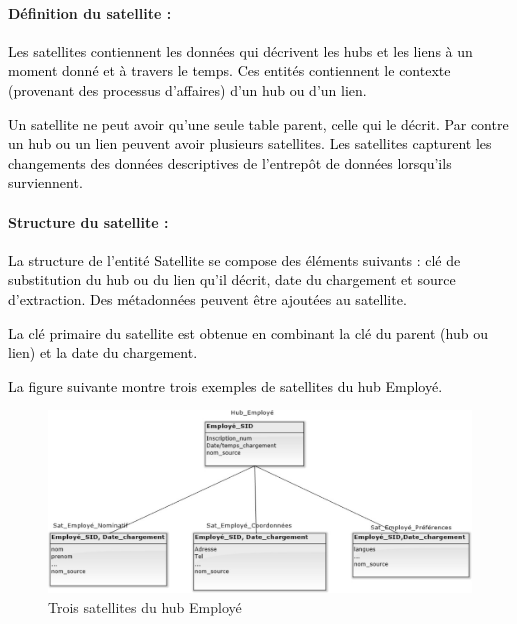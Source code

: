 \documentclass[a4paper,12pt]{report}
\begin{document}
\paragraph{Définition du satellite :}

\textcolor{black}{Les satellites contiennent les données qui décrivent les hubs et les liens à un moment donné et à travers le temps. Ces entités contiennent le contexte (provenant des processus d'affaires) d'un hub ou d'un lien\citep{7}.}

\textcolor{black}{Un satellite ne peut avoir qu’une seule table parent, celle qui le décrit. Par contre un hub ou un lien peuvent avoir plusieurs satellites.
Les satellites capturent les changements des données descriptives de l’entrepôt de données lorsqu’ils surviennent.}

\paragraph{Structure du satellite :}

\textcolor{black}{La structure de l’entité Satellite se compose des éléments suivants : clé de substitution du hub ou du lien qu’il décrit, date du chargement et source d’extraction. Des métadonnées peuvent être ajoutées au satellite.}

\textcolor{black}{La clé primaire du satellite est obtenue en combinant la clé du parent (hub ou lien) et la date du chargement.}

\textcolor{black}{La figure suivante montre trois exemples de satellites du hub Employé.}

\begin{figure}[H]

\begin{center}
\includegraphics[width=0.8\linewidth]{./images/21}
\end{center}

\caption{Trois satellites du hub Employé}
\label{fig:21}

\end{figure}
\end{document}
